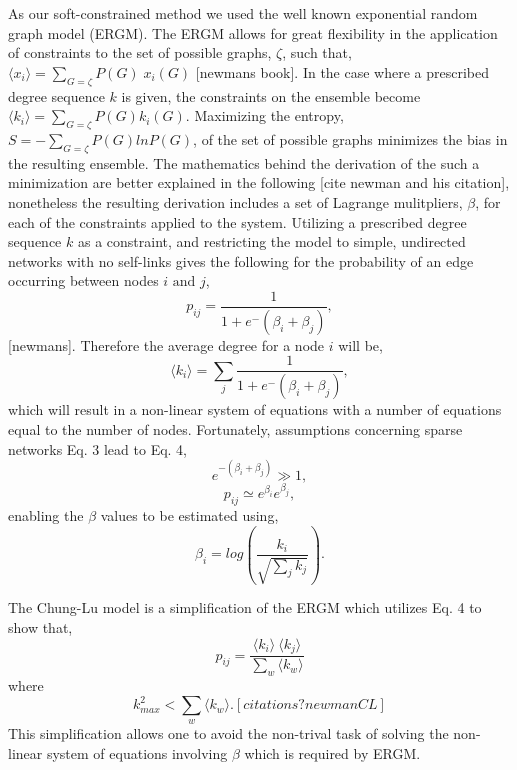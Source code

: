 \documentclass[aip,graphicx,amsmath]{revtex4-1}
\begin{document}
	As our soft-constrained method we used the well known exponential random graph model (ERGM). The ERGM allows for great flexibility in the application of constraints to the set of possible graphs, $\zeta$, such that, $\langle x_i \rangle = \displaystyle\sum_{G = \zeta} P(G)\;x_i(G)$ [newmans book]. In the case where a prescribed degree sequence $k$ is given, the constraints on the ensemble become $\langle k_i \rangle= \displaystyle\sum_{G = \zeta} P(G) k_i(G)$. Maximizing the entropy, $S = -\displaystyle\sum_{G = \zeta} P(G) ln P(G)$, of the set of possible graphs minimizes the bias in the resulting ensemble. The mathematics behind the derivation of the such a minimization are better explained in the following [cite newman and his citation], nonetheless the resulting derivation includes a set of Lagrange mulitpliers, $\beta$, for each of the constraints applied to the system. Utilizing a prescribed degree sequence $k$ as a constraint, and restricting the model to simple, undirected networks with no self-links gives the following for the probability of an edge occurring between nodes $i \text{ and } j$, 
\begin{equation} 
	p_{ij}  =  \frac{1}{1+e^-(\beta_i + \beta_j)},
\end{equation}
[newmans]. Therefore the average degree for a node $i$ will be, 
\begin{equation}
	\langle k_i \rangle = \displaystyle\sum_{j} \frac{1}{1+e^-(\beta_i + \beta_j)}, 
\end{equation}
which will result in a non-linear system of equations with a number of equations equal to the number of nodes. Fortunately, assumptions concerning sparse networks  Eq. 3 lead to Eq. 4, 
\begin{equation}
	e^{-(\beta_i + \beta_j)} \gg 1, 
\end{equation}
\begin{equation}
	p_{ij} \simeq e^{\beta_i}e^{\beta_j}, 
\end{equation}
enabling the $\beta$ values to be estimated using, 
\begin{equation} 
	\beta_i=log(\frac{k_i}{\sqrt{\sum_j{k_j}}}).
\end{equation} 
	
	The Chung-Lu model is a simplification of the ERGM which utilizes Eq. 4 to show that,
\begin{equation}
	p_{ij} = \frac{\langle k_i\rangle \: \langle k_j \rangle}{\sum_w{\langle k_w\rangle}}
\end{equation}
where
\begin{equation}
	k_{max}^2 < \sum_w \langle k_w \rangle. [citations? newman CL]
\end{equation}
This simplification allows one to avoid the non-trival task of solving the non-linear system of equations involving $\beta$ which is required by ERGM.
\end{document}

